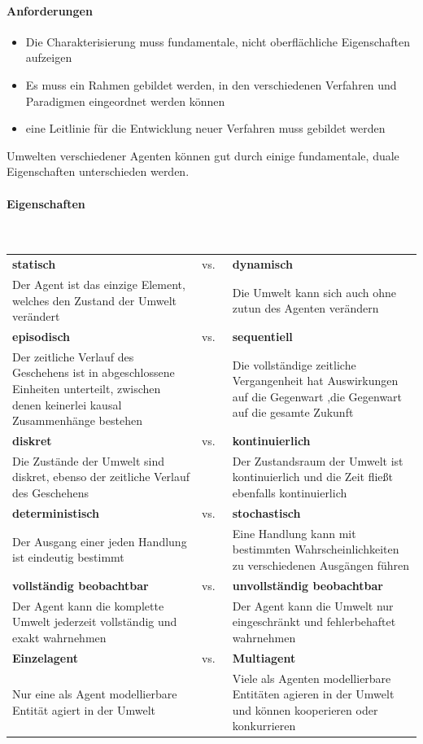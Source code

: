 \paragraph{Anforderungen}
\begin{itemize}
	\item Die Charakterisierung muss fundamentale, nicht oberflächliche Eigenschaften aufzeigen
	\item Es muss ein Rahmen gebildet werden, in den verschiedenen Verfahren und Paradigmen eingeordnet werden können
	\item eine Leitlinie für die Entwicklung neuer Verfahren muss gebildet werden
\end{itemize}
Umwelten verschiedener Agenten können gut durch einige fundamentale, duale Eigenschaften unterschieden werden.
\paragraph{Eigenschaften} \mbox{}
\vspace{1em} \\
\begin{tabular}{p{} p{} p{}}
\textbf{statisch} & \centering vs.\ & \textbf{dynamisch}\\
Der Agent ist das einzige Element, welches den Zustand der Umwelt verändert
& &
Die Umwelt kann sich auch ohne zutun des Agenten verändern
\\
\textbf{episodisch} & \centering vs.\ & \textbf{sequentiell}\\
Der zeitliche Verlauf des Geschehens  ist in abgeschlossene Einheiten unterteilt, zwischen denen keinerlei kausal Zusammenhänge bestehen
& &
Die vollständige zeitliche Vergangenheit hat Auswirkungen auf die Gegenwart ,die Gegenwart auf die gesamte Zukunft
\\
\textbf{diskret} & \centering vs.\ & \textbf{kontinuierlich}\\
Die Zustände der Umwelt sind diskret, ebenso der zeitliche Verlauf des Geschehens
& &
Der Zustandsraum der Umwelt ist kontinuierlich und die Zeit fließt ebenfalls kontinuierlich
\\
\textbf{deterministisch} & \centering vs.\ & \textbf{stochastisch}\\
Der Ausgang einer jeden Handlung ist eindeutig bestimmt
& &
Eine Handlung kann mit bestimmten Wahrscheinlichkeiten zu verschiedenen Ausgängen führen
\\
\textbf{vollständig beobachtbar} & \centering vs.\ & \textbf{unvollständig beobachtbar}\\
Der Agent kann die komplette Umwelt jederzeit vollständig und exakt wahrnehmen
& &
Der Agent kann die Umwelt nur eingeschränkt und fehlerbehaftet wahrnehmen
\\
\textbf{Einzelagent} & \centering vs.\ & \textbf{Multiagent}\\
Nur eine als Agent modellierbare Entität agiert in der Umwelt
& &
Viele als Agenten modellierbare Entitäten agieren in der Umwelt und können kooperieren oder konkurrieren
\end{tabular}

